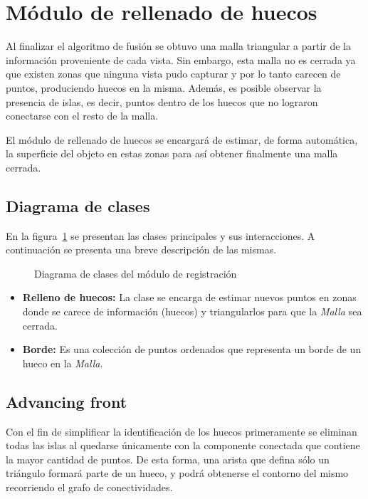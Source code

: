 \section{Módulo de rellenado de huecos}
	Al finalizar el algoritmo de fusión se obtuvo una malla triangular a partir
	de la información proveniente de cada vista.
	Sin embargo, esta malla no es cerrada ya que existen zonas que ninguna
	vista pudo capturar y por lo tanto carecen de puntos, produciendo huecos en la misma.
	Además, es posible observar la presencia de islas, es decir, puntos dentro de los huecos que no lograron conectarse con el resto de la malla.

	El módulo de rellenado de huecos se encargará de estimar, de forma automática, la superficie del
	objeto en estas zonas para así obtener finalmente una malla cerrada.

	\subsection{Diagrama de clases}
		En la figura~\ref{fig:filling_class} se presentan las clases principales y sus interacciones.
		A continuación se presenta una breve descripción de las mismas.
		\begin{figure}
			\caption{\label{fig:filling_class}Diagrama de clases del módulo de registración}
		\end{figure}

		\begin{itemize}
			\item {\bfseries Relleno de huecos:} La clase se encarga de estimar
				nuevos puntos en zonas donde se carece de información (huecos)
				y triangularlos para que la \emph{Malla} sea cerrada.
			\item {\bfseries Borde:} Es una colección de puntos ordenados
				que representa un borde de un hueco en la \emph{Malla}.
		\end{itemize}

	\subsection{Advancing front}
		Con el fin de simplificar la identificación de los huecos primeramente se eliminan
		todas las islas al quedarse únicamente con la componente conectada que
		contiene la mayor cantidad de puntos.
		De esta forma, una arista que defina sólo un triángulo formará parte de un hueco,
		y podrá obtenerse el contorno del mismo recorriendo el grafo de conectividades. 

